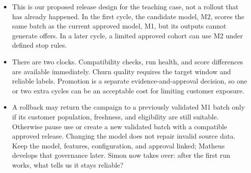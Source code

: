 \documentclass[11pt,a4paper]{article}
\begin{document}
\begin{examplebox}[title after break={SPOKEN SCRIPT --- slide 14 continued}]
\begin{itemize}
\item This is our proposed release design for the teaching case, not a rollout that has already happened. In the first cycle, the candidate model, M2, scores the same batch as the current approved model, M1, but its outputs cannot generate offers. In a later cycle, a limited approved cohort can use M2 under defined stop rules.
\item There are two clocks. Compatibility checks, run health, and score differences are available immediately. Churn quality requires the target window and reliable labels. Promotion is a separate evidence-and-approval decision, so one or two extra cycles can be an acceptable cost for limiting customer exposure.
\item A rollback may return the campaign to a previously validated M1 batch only if its customer population, freshness, and eligibility are still suitable. Otherwise pause use or create a new validated batch with a compatible approved release. Changing the model does not repair invalid source data. Keep the model, features, configuration, and approval linked; Matheus develops that governance later. Simon now takes over: after the first run works, what tells us it stays reliable?
\end{itemize}
\end{examplebox}
\par\noindent{\scriptsize\textcolor{teal!60!black}{Reading anchor: Breck et al., infra. tests 6–7 · Nazir et al., §4.1 · Proposed bank release design}}
\clearpage
\end{document}
